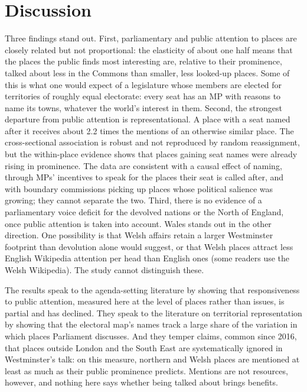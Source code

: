 \documentclass[11pt,a4paper]{article}
\begin{document}
\section{Discussion}
\label{sec:discussion}
Three findings stand out. First, parliamentary and public attention to places are closely related but not proportional: the elasticity of about one half means that the places the public finds most interesting are, relative to their prominence, talked about less in the Commons than smaller, less looked-up places. Some of this is what one would expect of a legislature whose members are elected for territories of roughly equal electorate: every seat has an MP with reasons to name its towns, whatever the world's interest in them. Second, the strongest departure from public attention is representational. A place with a seat named after it receives about 2.2 times the mentions of an otherwise similar place. The cross-sectional association is robust and not reproduced by random reassignment, but the within-place evidence shows that places gaining seat names were already rising in prominence. The data are consistent with a causal effect of naming, through MPs' incentives to speak for the places their seat is called after, and with boundary commissions picking up places whose political salience was growing; they cannot separate the two. Third, there is no evidence of a parliamentary voice deficit for the devolved nations or the North of England, once public attention is taken into account. Wales stands out in the other direction. One possibility is that Welsh affairs retain a larger Westminster footprint than devolution alone would suggest, or that Welsh places attract less English Wikipedia attention per head than English ones (some readers use the Welsh Wikipedia). The study cannot distinguish these.

The results speak to the agenda-setting literature by showing that responsiveness to public attention, measured here at the level of places rather than issues, is partial and has declined. They speak to the literature on territorial representation by showing that the electoral map's names track a large share of the variation in which places Parliament discusses. And they temper claims, common since 2016, that places outside London and the South East are systematically ignored in Westminster's talk: on this measure, northern and Welsh places are mentioned at least as much as their public prominence predicts. Mentions are not resources, however, and nothing here says whether being talked about brings benefits.
\end{document}
